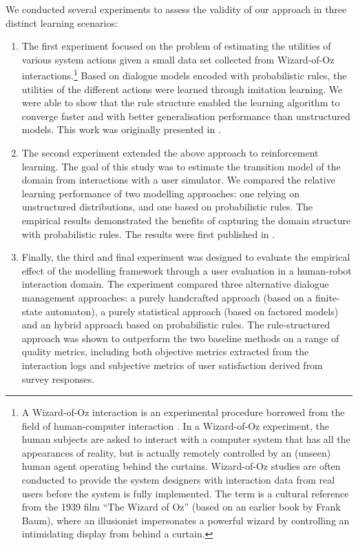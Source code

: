 We conducted several experiments to assess the validity of our approach in three distinct learning scenarios: \begin{enumerate} %
\item The first experiment focused on the problem of estimating the utilities of various system actions given a small data set collected from Wizard-of-Oz interactions.\footnote{A Wizard-of-Oz interaction is an experimental procedure borrowed from the field of human-computer interaction \citep{woz93}. In a Wizard-of-Oz experiment, the human subjects are asked to interact with a computer system that has all the appearances of reality, but is actually remotely controlled by an (unseen) human agent operating behind the curtains.  Wizard-of-Oz studies are often conducted to provide the system designers with interaction data from real users before the system is fully implemented.  The term is a cultural reference from the 1939 film ``The Wizard of Oz'' (based on an earlier book by Frank Baum), where an illusionist impersonates a powerful wizard by controlling an intimidating display from behind a curtain.}  Based on dialogue models encoded with probabilistic rules, the utilities of the different actions were learned through imitation learning. We were able to show that the rule structure enabled the learning algorithm to converge faster and with better generalisation performance than unstructured models. This work was originally presented in \citep{rulebasedmodels-sigdial2012}. 
\item The second experiment extended the above approach to reinforcement learning. The goal of this study was to estimate the transition model of the domain from interactions with a user simulator. We compared the relative learning performance of two modelling approaches: one relying on unstructured distributions, and one based on probabilistic rules. The empirical results demonstrated the benefits of capturing the domain structure with probabilistic rules. The results were first published in \citep{interspeech2013}. 
\item Finally, the third and final experiment was designed to evaluate the empirical effect of the modelling framework through a user evaluation in a human-robot interaction domain. The experiment compared three alternative dialogue management approaches: a purely handcrafted approach (based on a finite-state automaton), a purely statistical approach (based on factored models) and an hybrid approach based on probabilistic rules. The rule-structured approach was shown to outperform the two baseline methods on a range of quality metrics, including both objective metrics extracted from the interaction logs and subjective metrics of user satisfaction derived from survey responses. 
\end{enumerate}

